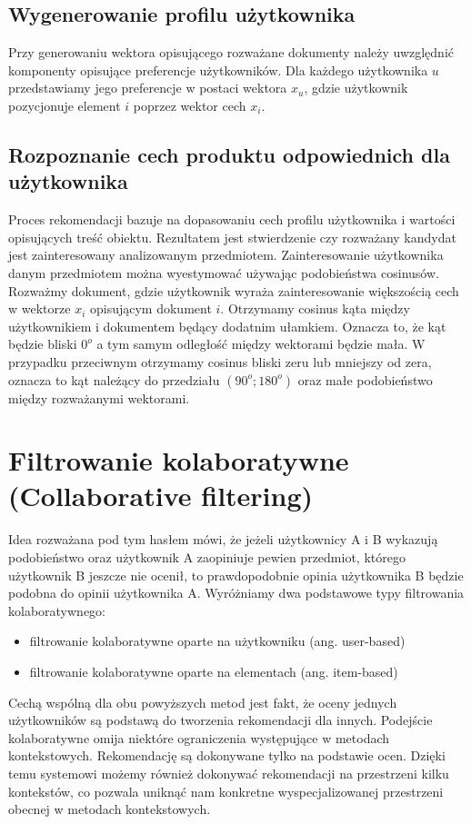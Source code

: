\documentclass[12pt,a4paper]{report}
\begin{document}
\subsection{Wygenerowanie profilu użytkownika}
Przy generowaniu wektora opisującego rozważane dokumenty należy uwzględnić komponenty opisujące preferencje użytkowników. Dla każdego użytkownika $u$ przedstawiamy jego preferencje w postaci wektora $x_u$, gdzie użytkownik pozycjonuje element $i$ poprzez wektor cech $x_i$.
\subsection{Rozpoznanie cech produktu odpowiednich dla użytkownika} 
Proces rekomendacji bazuje na dopasowaniu cech profilu użytkownika i wartości opisujących treść obiektu. Rezultatem jest stwierdzenie czy rozważany kandydat jest zainteresowany analizowanym przedmiotem. Zainteresowanie użytkownika danym przedmiotem można wyestymować używając podobieństwa cosinusów. Rozważmy dokument, gdzie użytkownik wyraża zainteresowanie większością cech w wektorze $x_i$ opisującym dokument $i$. Otrzymamy cosinus kąta między użytkownikiem i dokumentem będący dodatnim ułamkiem. Oznacza to, że kąt będzie bliski $0^{o}$ a tym samym odległość między wektorami będzie mała. W przypadku przeciwnym otrzymamy cosinus bliski zeru lub mniejszy od zera, oznacza to kąt należący do przedziału $(90^{o};180^{o})$ oraz małe podobieństwo między rozważanymi wektorami.




\section{Filtrowanie kolaboratywne (Collaborative filtering)}

Idea rozważana pod tym hasłem mówi, że jeżeli użytkownicy A i B wykazują podobieństwo oraz użytkownik A zaopiniuje pewien przedmiot, którego użytkownik B jeszcze nie ocenił, to prawdopodobnie opinia użytkownika B będzie podobna do opinii użytkownika A. Wyróżniamy dwa podstawowe typy filtrowania kolaboratywnego:
\begin{itemize}
\item filtrowanie kolaboratywne oparte na użytkowniku (ang. user-based)
\item filtrowanie kolaboratywne oparte na  elementach (ang. item-based)
\end{itemize}
Cechą wspólną dla obu powyższych metod jest fakt, że oceny jednych użytkowników są podstawą do tworzenia rekomendacji dla innych. 
Podejście kolaboratywne omija niektóre ograniczenia występujące w metodach kontekstowych. Rekomendację są dokonywane tylko na podstawie ocen. Dzięki temu systemowi możemy również dokonywać rekomendacji na przestrzeni kilku kontekstów, co pozwala uniknąć nam konkretne wyspecjalizowanej przestrzeni obecnej w metodach kontekstowych.
\end{document}
